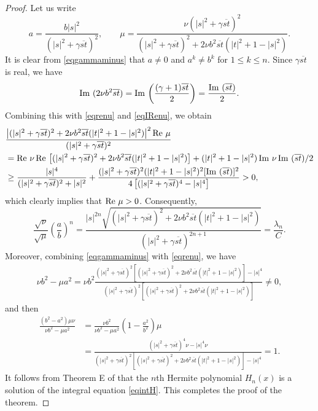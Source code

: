 \documentclass[reqno]{amsart}
\DeclareMathOperator{\re}{{\rm Re}\,}
\DeclareMathOperator{\im}{{\rm Im}\,}
\begin{document}
\begin{proof}
Let us write
$$a=\frac{b|s|^2}{\left(|s|^2+\gamma{\overline{st}}\right)^2},\qquad
\mu=\frac{\nu(|s|^2+\gamma{\overline{st}})^{2}}{(|s|^2+
\gamma{\overline{st}})^2+2\nu b^2{\overline{st}}(|t|^2+1-|s|^2)}.$$
It is clear from \eqref{eqgammaminus} that $a\neq 0$ and $a^{k}\neq b^{k}$
for $1\le k\leq n$. Since $\gamma\overline{st}$ is real, we have
$$\im\,(2\nu b^2\overline{st})=\im\left(\frac{(\gamma+1)
\overline{st}}{2}\right)=\frac{\im\,(\overline{st})}{2}.$$
Combining this with \eqref{eqrenu} and \eqref{eqIRenu}, we obtain
\begin{align*}
&\frac{\left|(|s|^2+\gamma{\overline{st}})^2+
2\nu b^2{\overline{st}}(|t|^2+1-|s|^2)\right|^2\re \mu }
{(|s|^2+\gamma{\overline{st}})^{2}}\\
&=\re\nu\re\left[(|s|^2+\gamma{\overline{st}})^2+
2{\nu b^2{\overline{st}}}(|t|^2+1-|s|^2)\right]+(|t|^2+1-|s|^2)
\im\nu\im\,(\overline{st})/2 \\
&\geq\frac{|s|^4}{(|s|^2+\gamma{\overline{st}})^{2}+|s|^2}
+\frac{(|s|^2+\gamma{\overline{st}})^2(|t|^2+1-|s|^2)^2
[\im\,(\overline{st})]^2}{4\left[(|s|^2+\gamma{\overline{st}})^{4}
-|s|^4\right]}>0,
\end{align*}
which clearly implies that $\re \mu >0$. Consequently,
$$\frac{\sqrt{\nu}}{\sqrt{\mu}}\left(\frac{a}{b}\right)^n=\frac{|s|^{2n}\sqrt{(|s|^2+
\gamma{\overline{st}})^2+2\nu b^2{\overline{st}}(|t|^2+1-|s|^2)}}{(|s|^2+\gamma{\overline{st}})^{2n+1}}=\frac{\lambda_n}{C}.
$$
Moreover, combining \eqref{eqgammaminus} with \eqref{eqrenu}, we have
\begin{align*}
\nu b^2-\mu a^2=\nu b^2\frac{(|s|^2+\gamma{\overline{st}})^{2}
\left[(|s|^2+\gamma{\overline{st}})^2+2\nu b^2{\overline{st}}
(|t|^2+1-|s|^2)\right]-|s|^4}{(|s|^2+\gamma{\overline{st}})^{2}
\left[(|s|^2+\gamma{\overline{st}})^2+2\nu b^2{\overline{st}}
(|t|^2+1-|s|^2)\right]}\neq0,
\end{align*}
and then
\begin{align*}
\frac{(b^2-a^2)\mu\nu}{\nu b^2-\mu a^2}
&=\frac{\nu b^2}{\nu b^2-\mu a^2}\left(1-\frac{a^2}{b^2}\right)\mu\\
&=\frac{(|s|^2+\gamma{\overline{st}})^{4}\nu-|s|^4\nu}
{(|s|^2+\gamma{\overline{st}})^{2}\left[(|s|^2+
\gamma{\overline{st}})^2+2\nu b^2{\overline{st}}
(|t|^2+1-|s|^2)\right]-|s|^4}=1.
\end{align*}
It follows from Theorem E of \cite{DZ3} that the $n$th Hermite
polynomial $H_n(x)$ is a solution of the integral equation \eqref{eqintH}.
This completes the proof of the theorem.
\end{proof}
\end{document}
